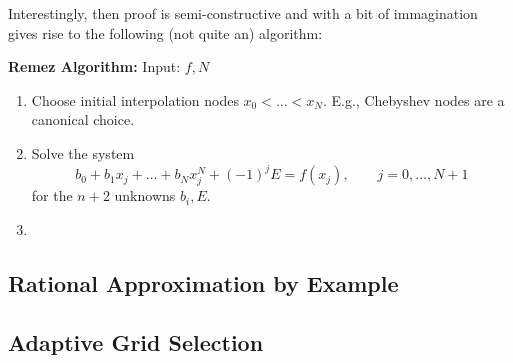 Interestingly, then proof is semi-constructive and with a bit of immagination 
gives rise to the following (not quite an) algorithm:

{\bf Remez Algorithm:} Input: $f, N$
\begin{enumerate}
\item Choose initial interpolation nodes $x_0 < \dots < x_N$. E.g., Chebyshev 
nodes are a canonical choice. 
\item Solve the system 
\[
      b_0 + b_1 x_j + \dots + b_{N} x_{j}^{N} + (-1)^j E = f(x_j), 
      \qquad j = 0, \dots, N+1
\]
for the $n+2$ unknowns $b_i, E$.
\item 
\end{enumerate}



\subsection{Rational Approximation by Example}



\subsection{Adaptive Grid Selection}




